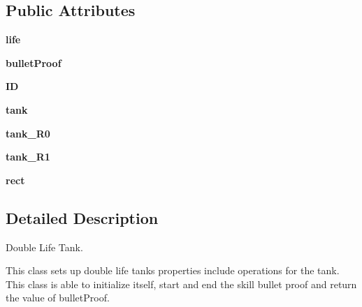 \subsection*{Public Attributes}
\begin{DoxyCompactItemize}
\item 
\mbox{\label{classdouble_life_tank_1_1double_life_tank_a6dbe44716a41ae79aee95baaba565169}} 
{\bfseries life}
\item 
\mbox{\label{classdouble_life_tank_1_1double_life_tank_a0cb8f79729d076bd49de85541f33051c}} 
{\bfseries bullet\+Proof}
\item 
\mbox{\label{classdouble_life_tank_1_1double_life_tank_aed5fa466d8384634d5fb9241acbe8541}} 
{\bfseries ID}
\item 
\mbox{\label{classdouble_life_tank_1_1double_life_tank_aa7c48b232b60a6a425d32f7a7e341c00}} 
{\bfseries tank}
\item 
\mbox{\label{classdouble_life_tank_1_1double_life_tank_a0e61d82a59db6434cdc46d65869ea18a}} 
{\bfseries tank\+\_\+\+R0}
\item 
\mbox{\label{classdouble_life_tank_1_1double_life_tank_a718cfcad4573a5a640897e3aac71e07b}} 
{\bfseries tank\+\_\+\+R1}
\item 
\mbox{\label{classdouble_life_tank_1_1double_life_tank_a085b899af4eaa60c980c7ec211cb7a53}} 
{\bfseries rect}
\end{DoxyCompactItemize}


\subsection{Detailed Description}
Double Life Tank. 

This class sets up double life tank\textquotesingle{}s properties include operations for the tank. This class is able to initialize itself, start and end the skill bullet proof and return the value of bullet\+Proof. 

